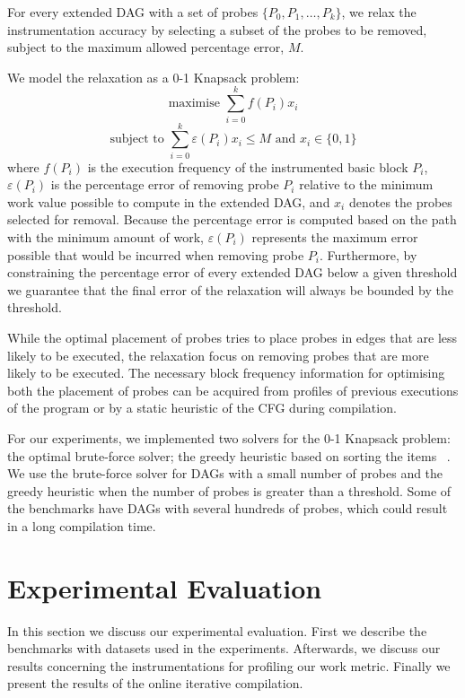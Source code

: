 \documentclass[sigplan,9pt]{acmart}
\newcommand{\itercomp}{{iterative compilation}}
\begin{document}
For every extended DAG with a set of probes $\{P_0, P_1, \ldots, P_k\}$, we relax the instrumentation accuracy by selecting a subset of the probes to be removed, subject to the maximum allowed percentage error, $M$.

We model the relaxation as a 0-1 Knapsack problem:
\[
\textrm{maximise } \sum_{i=0}^{k} f(P_i)x_i
\]
\[
\textrm{subject to } \sum_{i=0}^{k} \varepsilon(P_i)x_i \leq M \textrm{ and } x_i\in\{0,1\}
\]
where $f(P_i)$ is the execution frequency of the instrumented basic block $P_i$, $\varepsilon(P_i)$ is the percentage error of removing probe $P_i$ relative to the minimum work value possible to compute in the extended DAG, and $x_i$ denotes the probes selected for removal.
Because the percentage error is computed based on the path with the minimum amount of work, $\varepsilon(P_i)$ represents the maximum error possible that would be incurred when removing probe $P_i$.
Furthermore, by constraining the percentage error of every extended DAG below a given threshold we guarantee that the final error of the relaxation will always be bounded by the threshold.

While the optimal placement of probes tries to place probes in edges that are less likely to be executed, the relaxation focus on removing probes that are more likely to be executed.
The necessary block frequency information for optimising both the placement of probes can be acquired from profiles of previous executions of the program or by a static heuristic of the CFG during compilation.

For our experiments, we implemented two solvers for the 0-1 Knapsack problem:
the optimal brute-force solver;
the greedy heuristic based on sorting the items ~\cite{dantzig57}.
We use the brute-force solver for DAGs with a small number of probes and the greedy heuristic when the number of probes is greater than a threshold.
Some of the benchmarks have DAGs with several hundreds of probes, which could result in a long compilation time.

\section{Experimental Evaluation}

In this section we discuss our experimental evaluation.
First we describe the benchmarks with datasets used in the experiments.
Afterwards, we discuss our results concerning the instrumentations for profiling our work metric.
Finally we present the results of the online {\itercomp}.
\end{document}
